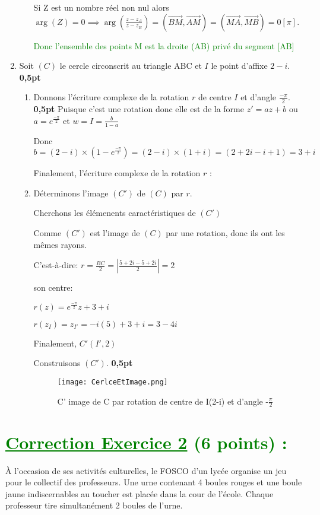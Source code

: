 \documentclass[12pt]{article}
\begin{document}
\begin{enumerate}
\begin{enumerate}
		Si Z est un nombre réel non nul alors \\$ \arg(Z)=0\implies \arg(\frac{z-z_{A}}{z-z_{B}})=(\overrightarrow{BM},\overrightarrow{AM})=(\overrightarrow{MA},\overrightarrow{MB})=0[\pi]$.
		
		\textcolor{green}{Donc l’ensemble des points M est la droite (AB) privé du segment [AB]}
  \end{enumerate}
   \item Soit $(C)$ le cercle circonscrit au triangle ABC et $I$ le point d’affixe $2 - i$.\textbf{ 0,5pt}
   \begin{enumerate}
     \item Donnons l’écriture complexe de la rotation $r$ de centre $I$ et d’angle $\frac{-\pi}{2}$.\textbf{ 0,5pt}
     Puisque c'est une rotation donc elle est de la forme $z'=az+b$ ou $a=e^{\frac{-\pi}{2}}$ et $w=I=\frac{b}{1-a}$
     
     Donc $b=(2 - i)\times (1-e^{\frac{-\pi}{2}})=(2 - i)\times (1+i)=(2 +2i-i+1)=3+i$
     
     Finalement, l’écriture complexe de la rotation $r$ :
     \textcolor{green}{}
     \item Déterminons l’image $(C')$ de $(C)$ par $r$.
     
     Cherchons les élémenents caractéristiques de $(C')$
     
     Comme $(C')$ est l'image de $(C)$ par une rotation, donc ils ont les mêmes rayons. 
     
     C'est-à-dire: $r=\frac{BC}{2}=|\frac{5+2i-5+2i}{2}|=2$
     
     son centre:
     
     $r(z)=e^{\frac{-\pi}{2}}z+3+i$
     
     $r(z_{I})=z_{I'}=-i(5)+3+i=3-4i$
     
     \textcolor{green}{}
     
     Finalement, $C'(I',2)$
     
     Construisons $(C')$.\textbf{ 0,5pt}
\newpage   
\begin{figure}[h]
\centering
\texttt{[image: CerlceEtImage.png]}
\caption{C' image de C par rotation de centre de I(2-i) et d'angle -$\frac{\pi}{2}$}
\label{fig:monimage}
\end{figure}
   \end{enumerate}
\end{enumerate}
\section*{\textcolor{green}{\underline{Correction Exercice 2} (6 points) :}}
À l’occasion de ses activités culturelles, le FOSCO d’un lycée organise un jeu pour le collectif des professeurs. Une urne contenant 4 boules rouges et une boule jaune indiscernables au toucher est placée dans la cour de l’école. Chaque professeur tire simultanément 2 boules de l’urne.
\end{document}
